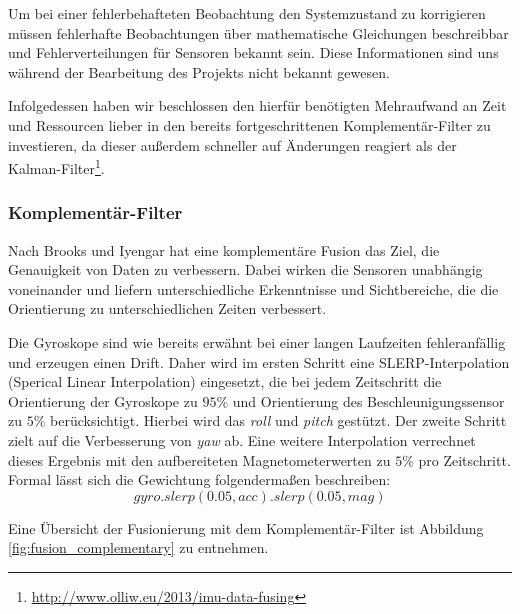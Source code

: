 Um bei einer fehlerbehafteten Beobachtung den Systemzustand zu korrigieren müssen fehlerhafte Beobachtungen über mathematische Gleichungen beschreibbar und Fehlerverteilungen für Sensoren bekannt sein. Diese Informationen sind uns während der Bearbeitung des Projekts nicht bekannt gewesen.

Infolgedessen haben wir beschlossen den hierfür benötigten Mehraufwand an Zeit und Ressourcen lieber in den bereits fortgeschrittenen Komplementär-Filter zu investieren, da dieser außerdem schneller auf Änderungen reagiert als der Kalman-Filter\footnote{\url{http://www.olliw.eu/2013/imu-data-fusing}}.

\subsubsection{Komplementär-Filter}
Nach Brooks und Iyengar \cite{Brooks.1998} hat eine komplementäre Fusion das Ziel, die Genauigkeit von Daten zu verbessern. 
Dabei wirken die Sensoren unabhängig voneinander und liefern unterschiedliche Erkenntnisse und Sichtbereiche, die die Orientierung zu unterschiedlichen Zeiten verbessert.

Die Gyroskope sind wie bereits erwähnt bei einer langen Laufzeiten fehleranfällig und erzeugen einen Drift. 
Daher wird im ersten Schritt eine SLERP-Interpolation (Sperical Linear Interpolation) eingesetzt, die bei jedem Zeitschritt die Orientierung der Gyroskope zu $95\%$ und Orientierung des Beschleunigungssensor zu $5\%$ berücksichtigt. Hierbei wird das \emph{roll} und \emph{pitch} gestützt. Der zweite Schritt zielt auf die Verbesserung von \emph{yaw} ab. Eine weitere Interpolation verrechnet dieses Ergebnis mit den aufbereiteten Magnetometerwerten zu $5\%$ pro Zeitschritt. Formal lässt sich die Gewichtung folgendermaßen beschreiben:
\begin{equation}
    gyro.slerp(0.05, acc).slerp(0.05, mag)
\end{equation}

Eine Übersicht der Fusionierung mit dem Komplementär-Filter ist Abbildung \ref{fig:fusion_complementary} zu entnehmen.

